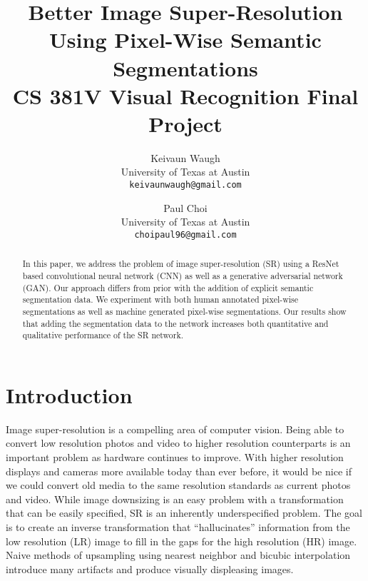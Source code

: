 \documentclass[10pt,twocolumn,letterpaper]{article}
\begin{document}
\title{
    Better Image Super-Resolution Using Pixel-Wise Semantic Segmentations \\
    \large CS 381V Visual Recognition Final Project}

\author{Keivaun Waugh\\
University of Texas at Austin\\
{\tt\small keivaunwaugh@gmail.com}
\and
Paul Choi\\
University of Texas at Austin\\
{\tt\small choipaul96@gmail.com}
}

\maketitle

\begin{abstract}
In this paper, we address the problem of image super-resolution (SR) using
a ResNet based convolutional neural network (CNN) as well as a generative
adversarial network (GAN). Our approach differs from prior with the
addition of explicit semantic segmentation data. We experiment with both
human annotated pixel-wise segmentations as well as machine generated
pixel-wise segmentations. Our results show that adding the segmentation
data to the network increases both quantitative and qualitative performance
of the SR network.
\end{abstract}

\section{Introduction}
Image super-resolution is a compelling area of computer vision. Being able to
convert low resolution photos and video to higher resolution counterparts is an
important problem as hardware continues to improve. With higher resolution
displays and cameras more available today than ever before, it would be nice if
we could convert old media to the same resolution standards as current photos
and video. While image downsizing is an easy problem with a transformation that
can be easily specified, SR is an inherently underspecified problem. The goal
is to create an inverse transformation that ``hallucinates'' information from
the low resolution (LR) image to fill in the gaps for the high resolution (HR)
image. Naive methods of upsampling using nearest neighbor and bicubic
interpolation introduce many artifacts and produce visually displeasing images.
\end{document}
